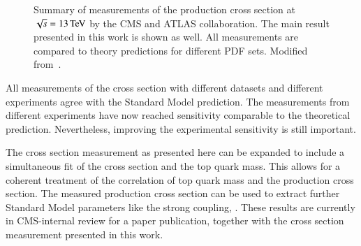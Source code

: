 \begin{figure}[htbp!]
  \begin{center}

\caption{Summary of measurements of the \ttbar production cross section at $\sqrt{s}=13 \,\text{Te\hspace{-.08em}V}$ by the CMS and ATLAS collaboration.
The main result presented in this work is shown as well. All measurements are compared to theory predictions for different PDF sets.
Modified from~\cite{Topsum}.
       \label{fig:sum}}
  \end{center}
\end{figure}

All measurements of the \ttbar cross section with different datasets and different experiments agree with the Standard Model prediction.
The measurements from different experiments have now reached sensitivity comparable to the theoretical prediction. Nevertheless, improving the experimental sensitivity is still important.

The cross section measurement as presented here can be expanded to include a simultaneous fit of the cross section and the top quark mass.
This allows for a coherent treatment of the correlation of top quark mass and the \ttbar production cross section.
The measured \ttbar production cross section can be used to extract
further Standard Model parameters like the strong coupling, \as. These results are currently in CMS-internal review for a paper publication, together with the cross section measurement presented in this work.

